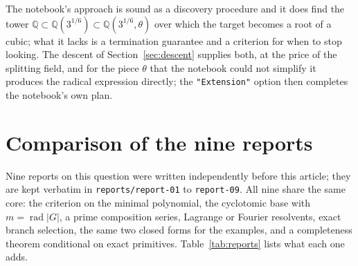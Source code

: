\documentclass[11pt,a4paper]{article}
\theoremstyle{definition}
\theoremstyle{remark}
\newcommand{\Q}{\mathbb{Q}}
\newcommand{\rad}{\operatorname{rad}}
\newcommand{\code}[1]{\texttt{#1}}
\begin{document}
The notebook's approach is sound as a discovery procedure and it does find the tower
$\Q\subset\Q(3^{1/6})\subset\Q(3^{1/6},\theta)$ over which the target becomes a root of
a cubic; what it lacks is a termination guarantee and a criterion for when to stop
looking.  The descent of Section~\ref{sec:descent} supplies both, at the price of the
splitting field, and for the piece $\theta$ that the notebook could not simplify it
produces the radical expression directly; the \code{"Extension"} option then completes
the notebook's own plan.

\section{Comparison of the nine reports}\label{sec:reports}

Nine reports on this question were written independently before this article; they are
kept verbatim in \code{reports/report-01} to \code{report-09}.  All nine share the
same core: the criterion on the minimal polynomial, the cyclotomic base with
$m=\rad|G|$, a prime composition series, Lagrange or Fourier resolvents, exact branch
selection, the same two closed forms for the examples, and a completeness theorem
conditional on exact primitives.  Table~\ref{tab:reports} lists what each one adds.
\end{document}
